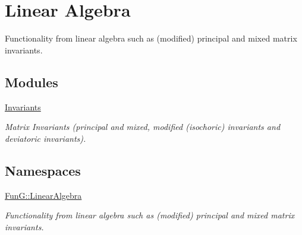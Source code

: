 \hypertarget{group__LinearAlgebraGroup}{}\section{Linear Algebra}
\label{group__LinearAlgebraGroup}


Functionality from linear algebra such as (modified) principal and mixed matrix invariants.  


\subsection*{Modules}
\begin{DoxyCompactItemize}
\item 
\hyperlink{group__InvariantGroup}{Invariants}
\begin{DoxyCompactList}\small\item\em Matrix Invariants (principal and mixed, modified (isochoric) invariants and deviatoric invariants). \end{DoxyCompactList}\end{DoxyCompactItemize}
\subsection*{Namespaces}
\begin{DoxyCompactItemize}
\item 
 \hyperlink{namespaceFunG_1_1LinearAlgebra}{Fun\+G\+::\+Linear\+Algebra}
\begin{DoxyCompactList}\small\item\em Functionality from linear algebra such as (modified) principal and mixed matrix invariants. \end{DoxyCompactList}\end{DoxyCompactItemize}
